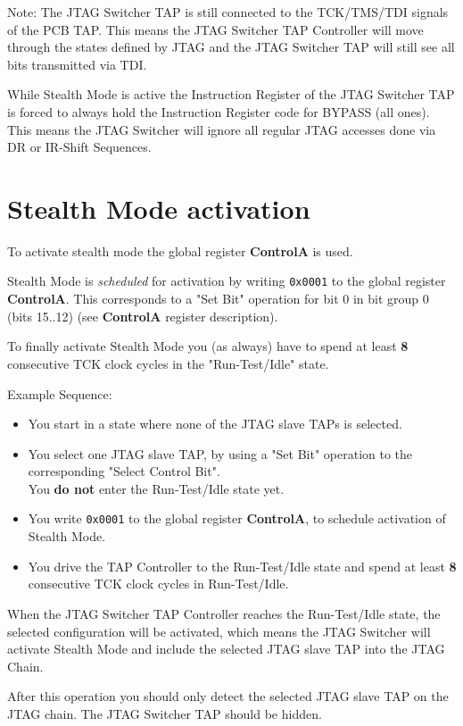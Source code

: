 \documentclass[10pt,english,a4paper]{report}
\begin{document}
Note: The JTAG Switcher TAP is still connected to the TCK/TMS/TDI signals
of the PCB TAP. This means the JTAG Switcher TAP Controller will move through
the states defined by JTAG and the JTAG Switcher TAP will still see all bits
transmitted via TDI.

\newpage
While Stealth Mode is active the Instruction Register of the JTAG Switcher
TAP is forced to always hold the Instruction Register code for BYPASS (all ones).
This means the JTAG Switcher will ignore all regular JTAG accesses done via
DR or IR-Shift Sequences.

\section{Stealth Mode activation}
To activate stealth mode the global register {\bf ControlA} is used.

Stealth Mode is {\em scheduled} for activation by writing {\tt 0x0001} to the global register {\bf ControlA}.
This corresponds to a "Set Bit" operation for bit 0 in bit group 0 (bits 15..12)
(see {\bf ControlA} register description).

To finally activate Stealth Mode you (as always) have to spend
at least {\bf 8} consecutive TCK clock cycles in the "Run-Test/Idle"
state.

Example Sequence:
\begin{itemize}
\item You start in a state where none of the JTAG slave TAPs is selected.
\item You select one JTAG slave TAP, by using a "Set Bit" operation to the corresponding "Select Control Bit".\\
You {\bf do not} enter the Run-Test/Idle state yet.
\item You write {\tt 0x0001} to the global register {\bf ControlA}, to schedule activation of Stealth Mode.
\item You drive the TAP Controller to the Run-Test/Idle state and spend at least {\bf 8}
consecutive TCK clock cycles in Run-Test/Idle.
\end{itemize}
When the JTAG Switcher TAP Controller reaches the Run-Test/Idle state, the selected configuration will
be activated, which means the JTAG Switcher will activate Stealth Mode and include the selected JTAG slave
TAP into the JTAG Chain.

After this operation you should only detect the selected JTAG slave TAP on the JTAG chain.
The JTAG Switcher TAP should be hidden.
\end{document}
